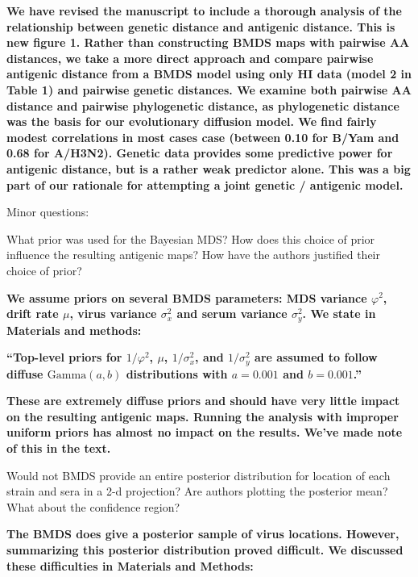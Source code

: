 \documentclass[11pt,oneside,letterpaper]{article}
\newcommand{\mdssd}{\varphi}						%
\newcommand{\virussd}{\sigma_x}						%
\newcommand{\serumsd}{\sigma_y}						%
\newcommand{\drift}{\mu}							%
\begin{document}
\textbf{We have revised the manuscript to include a thorough analysis of the relationship between genetic distance and antigenic distance.  This is new figure 1.  Rather than constructing BMDS maps with pairwise AA distances, we take a more direct approach and compare pairwise antigenic distance from a BMDS model using only HI data (model 2 in Table 1) and pairwise genetic distances.  We examine both pairwise AA distance and pairwise phylogenetic distance, as phylogenetic distance was the basis for our evolutionary diffusion model.  We find fairly modest correlations in most cases case (between 0.10 for B/Yam and 0.68 for A/H3N2).  Genetic data provides some predictive power for antigenic distance, but is a rather weak predictor alone.  This was a big part of our rationale for attempting a joint genetic / antigenic model.}

Minor questions:

What prior was used for the Bayesian MDS? How does this choice of prior influence the resulting antigenic maps? How have the authors justified their choice of prior?

\textbf{We assume priors on several BMDS parameters: MDS variance $\mdssd^2$, drift rate $\drift$, virus variance $\virussd^2$ and serum variance $\serumsd^2$.  We state in Materials and methods:}

\textbf{``Top-level priors for $1/\mdssd^2$, $\drift$, $1/\virussd^2$, and $1/\serumsd^2$ are assumed to follow diffuse $\mbox{Gamma}(a, b)$ distributions  with $a=0.001$ and $b=0.001$.''}

\textbf{These are extremely diffuse priors and should have very little impact on the resulting antigenic maps.  Running the analysis with improper uniform priors has almost no impact on the results.  We've made note of this in the text.}

Would not BMDS provide an entire posterior distribution for location of each strain and sera in a 2-d projection? Are authors plotting the posterior mean? What about the confidence region?

\textbf{The BMDS does give a posterior sample of virus locations.  However, summarizing this posterior distribution proved difficult.  We discussed these difficulties in Materials and Methods:}
\end{document}

